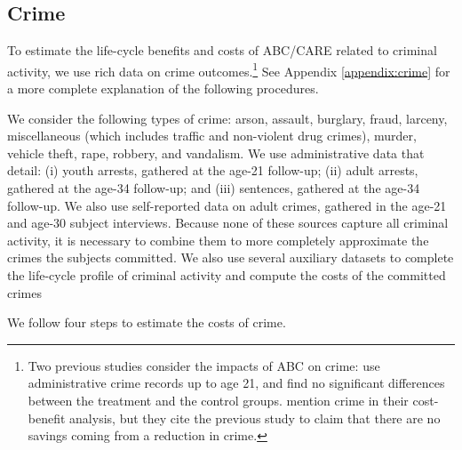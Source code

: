 \subsection{Crime}  \label{sec:crime}

To estimate the life-cycle benefits and costs of ABC/CARE related to criminal activity, we use rich data on crime outcomes.\footnote{Two previous studies consider the impacts of ABC on crime: \citet{Clarke_Campbell_1998_ABC_Comparison_ECRQ} use administrative crime records up to age 21, and find no significant differences between the treatment and the control groups. \cite{Barnett_Masse_2007_EER} mention crime in their cost-benefit analysis, but they cite the previous study to claim that there are no savings coming from a reduction in crime.} See Appendix \ref{appendix:crime} for a more complete explanation of the following procedures.

We consider the following types of crime: arson, assault, burglary, fraud, larceny, miscellaneous (which includes traffic and non-violent drug crimes), murder, vehicle theft, rape, robbery, and vandalism. We use administrative data that detail: (i) youth arrests, gathered at the age-21 follow-up; (ii) adult arrests, gathered at the age-34 follow-up; and (iii) sentences, gathered at the age-34 follow-up. We also use self-reported data on adult crimes, gathered in the age-21 and age-30 subject interviews. Because none of these sources capture all criminal activity, it is necessary to combine them to more completely approximate the crimes the subjects committed. We also use several auxiliary datasets to complete the life-cycle profile of criminal activity and compute the costs of the committed crimes

We follow four steps to estimate the costs of crime.

